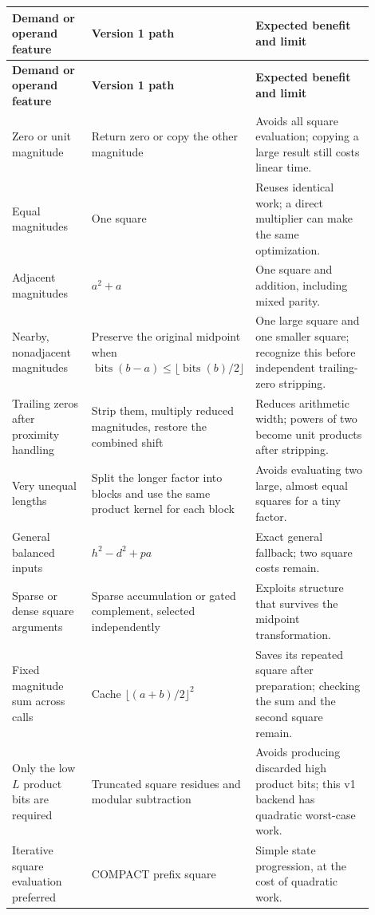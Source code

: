 \documentclass[11pt,a4paper]{article}
\begin{document}
\begingroup
\small
\setlength{\tabcolsep}{4pt}
\begin{longtable}{>{\raggedright\arraybackslash}p{0.23\linewidth}>{\raggedright\arraybackslash}p{0.31\linewidth}>{\raggedright\arraybackslash}p{0.36\linewidth}}
\toprule
\textbf{Demand or operand feature} & \textbf{Version 1 path} & \textbf{Expected benefit and limit} \\
\midrule
\endfirsthead
\toprule
\textbf{Demand or operand feature} & \textbf{Version 1 path} & \textbf{Expected benefit and limit} \\
\midrule
\endhead
\bottomrule
\endfoot
Zero or unit magnitude & Return zero or copy the other magnitude & Avoids all square evaluation; copying a large result still costs linear time. \\
Equal magnitudes & One square & Reuses identical work; a direct multiplier can make the same optimization. \\
Adjacent magnitudes & $a^2+a$ & One square and addition, including mixed parity. \\
Nearby, nonadjacent magnitudes & Preserve the original midpoint when $\operatorname{bits}(b-a)\le\lfloor\operatorname{bits}(b)/2\rfloor$ & One large square and one smaller square; recognize this before independent trailing-zero stripping. \\
Trailing zeros after proximity handling & Strip them, multiply reduced magnitudes, restore the combined shift & Reduces arithmetic width; powers of two become unit products after stripping. \\
Very unequal lengths & Split the longer factor into blocks and use the same product kernel for each block & Avoids evaluating two large, almost equal squares for a tiny factor. \\
General balanced inputs & $h^2-d^2+pa$ & Exact general fallback; two square costs remain. \\
Sparse or dense square arguments & Sparse accumulation or gated complement, selected independently & Exploits structure that survives the midpoint transformation. \\
Fixed magnitude sum across calls & Cache $\lfloor(a+b)/2\rfloor^2$ & Saves its repeated square after preparation; checking the sum and the second square remain. \\
Only the low $L$ product bits are required & Truncated square residues and modular subtraction & Avoids producing discarded high product bits; this v1 backend has quadratic worst-case work. \\
Iterative square evaluation preferred & COMPACT prefix square & Simple state progression, at the cost of quadratic work. \\
\end{longtable}
\endgroup
\end{document}
